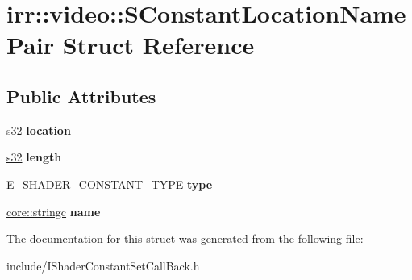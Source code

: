 \hypertarget{structirr_1_1video_1_1SConstantLocationNamePair}{}\section{irr\+:\+:video\+:\+:S\+Constant\+Location\+Name\+Pair Struct Reference}
\label{structirr_1_1video_1_1SConstantLocationNamePair}
\subsection*{Public Attributes}
\begin{DoxyCompactItemize}
\item 
\hyperlink{namespaceirr_ac66849b7a6ed16e30ebede579f9b47c6}{s32} {\bfseries location}\hypertarget{structirr_1_1video_1_1SConstantLocationNamePair_a01169ad320d9f88c07d7c3ee8be26485}{}\label{structirr_1_1video_1_1SConstantLocationNamePair_a01169ad320d9f88c07d7c3ee8be26485}

\item 
\hyperlink{namespaceirr_ac66849b7a6ed16e30ebede579f9b47c6}{s32} {\bfseries length}\hypertarget{structirr_1_1video_1_1SConstantLocationNamePair_a7eb2c68a4c5926c6a0d4ca87208b9a79}{}\label{structirr_1_1video_1_1SConstantLocationNamePair_a7eb2c68a4c5926c6a0d4ca87208b9a79}

\item 
E\+\_\+\+S\+H\+A\+D\+E\+R\+\_\+\+C\+O\+N\+S\+T\+A\+N\+T\+\_\+\+T\+Y\+PE {\bfseries type}\hypertarget{structirr_1_1video_1_1SConstantLocationNamePair_aa8a8eca6369e2ffca211aec7a3d414ba}{}\label{structirr_1_1video_1_1SConstantLocationNamePair_aa8a8eca6369e2ffca211aec7a3d414ba}

\item 
\hyperlink{namespaceirr_1_1core_ade1071a878633f2f6d8a75c5d11fec19}{core\+::stringc} {\bfseries name}\hypertarget{structirr_1_1video_1_1SConstantLocationNamePair_a73ed82d65efe24c947843f924c11f216}{}\label{structirr_1_1video_1_1SConstantLocationNamePair_a73ed82d65efe24c947843f924c11f216}

\end{DoxyCompactItemize}


The documentation for this struct was generated from the following file\+:\begin{DoxyCompactItemize}
\item 
include/I\+Shader\+Constant\+Set\+Call\+Back.\+h\end{DoxyCompactItemize}
